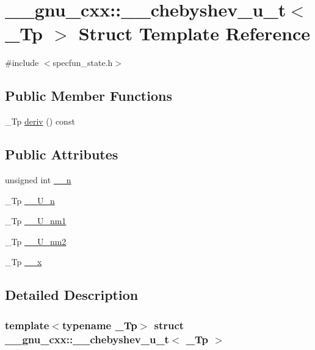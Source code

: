 \hypertarget{struct____gnu__cxx_1_1____chebyshev__u__t}{}\section{\+\_\+\+\_\+gnu\+\_\+cxx\+:\+:\+\_\+\+\_\+chebyshev\+\_\+u\+\_\+t$<$ \+\_\+\+Tp $>$ Struct Template Reference}
\label{struct____gnu__cxx_1_1____chebyshev__u__t}


{\ttfamily \#include $<$specfun\+\_\+state.\+h$>$}

\subsection*{Public Member Functions}
\begin{DoxyCompactItemize}
\item 
\+\_\+\+Tp \hyperlink{struct____gnu__cxx_1_1____chebyshev__u__t_ad850788d0ce4eb967c52692f599073cd}{deriv} () const
\end{DoxyCompactItemize}
\subsection*{Public Attributes}
\begin{DoxyCompactItemize}
\item 
unsigned int \hyperlink{struct____gnu__cxx_1_1____chebyshev__u__t_ab003ba7c50085f45f538ab1143ab6fb9}{\+\_\+\+\_\+n}
\item 
\+\_\+\+Tp \hyperlink{struct____gnu__cxx_1_1____chebyshev__u__t_a515faf25d4a4d05274fabd742db18eac}{\+\_\+\+\_\+\+U\+\_\+n}
\item 
\+\_\+\+Tp \hyperlink{struct____gnu__cxx_1_1____chebyshev__u__t_a0e3eb1db01a23349452f9909b13d61a2}{\+\_\+\+\_\+\+U\+\_\+nm1}
\item 
\+\_\+\+Tp \hyperlink{struct____gnu__cxx_1_1____chebyshev__u__t_aaf3bcdc6d46aaa2c173e0b07a1e36827}{\+\_\+\+\_\+\+U\+\_\+nm2}
\item 
\+\_\+\+Tp \hyperlink{struct____gnu__cxx_1_1____chebyshev__u__t_a038c998d409d5fb0404df67afb9b217c}{\+\_\+\+\_\+x}
\end{DoxyCompactItemize}


\subsection{Detailed Description}
\subsubsection*{template$<$typename \+\_\+\+Tp$>$\newline
struct \+\_\+\+\_\+gnu\+\_\+cxx\+::\+\_\+\+\_\+chebyshev\+\_\+u\+\_\+t$<$ \+\_\+\+Tp $>$}

